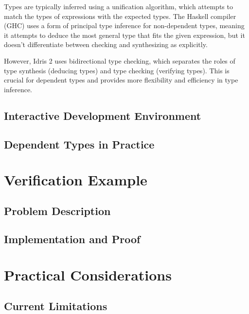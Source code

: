 \documentclass[]{rptuseminar}
\begin{document}
Types are typically inferred using a unification algorithm, which attempts to match the types of expressions with the expected types.
The Haskell compiler (GHC) uses a form of principal type inference for non-dependent types, meaning it attempts to deduce the most general type that fits the given expression, but it doesn't differentiate between checking and synthesizing as explicitly.

However, Idris 2 uses bidirectional type checking, which separates the roles of type synthesis (deducing types) and type checking (verifying types). This is crucial for dependent types and provides more flexibility and efficiency in type inference.

\subsection{Interactive Development Environment}  
\label{subsec:ide}  

\subsection{Dependent Types in Practice}  
\label{subsec:dependent-types}  

\section{Verification Example}  
\label{sec:verification-example}  
\subsection{Problem Description}  
\label{subsec:problem-desc}  

\subsection{Implementation and Proof}  
\label{subsec:implementation}  

\section{Practical Considerations}  
\label{sec:practical-considerations}  
\subsection{Current Limitations}  
\label{subsec:limitations}  
\end{document}
